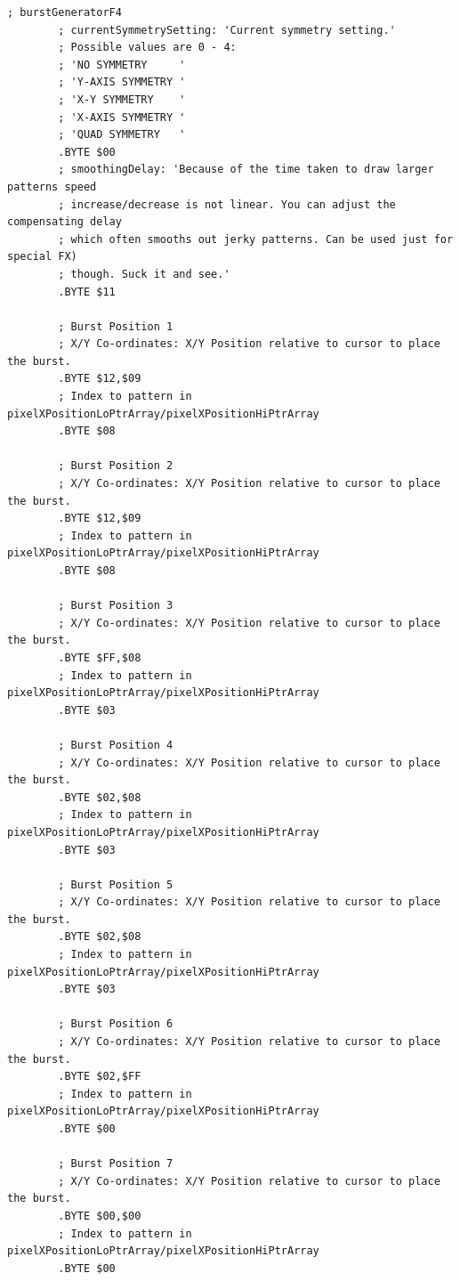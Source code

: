 \begin{lstlisting}[basicstyle=\tiny,caption=Source code for the F3 Burst.]
; burstGeneratorF4
        ; currentSymmetrySetting: 'Current symmetry setting.'
        ; Possible values are 0 - 4:
        ; 'NO SYMMETRY     '
        ; 'Y-AXIS SYMMETRY '
        ; 'X-Y SYMMETRY    '
        ; 'X-AXIS SYMMETRY '
        ; 'QUAD SYMMETRY   '
        .BYTE $00
        ; smoothingDelay: 'Because of the time taken to draw larger patterns speed
        ; increase/decrease is not linear. You can adjust the compensating delay
        ; which often smooths out jerky patterns. Can be used just for special FX)
        ; though. Suck it and see.'
        .BYTE $11

        ; Burst Position 1
        ; X/Y Co-ordinates: X/Y Position relative to cursor to place the burst.
        .BYTE $12,$09
        ; Index to pattern in pixelXPositionLoPtrArray/pixelXPositionHiPtrArray
        .BYTE $08

        ; Burst Position 2
        ; X/Y Co-ordinates: X/Y Position relative to cursor to place the burst.
        .BYTE $12,$09
        ; Index to pattern in pixelXPositionLoPtrArray/pixelXPositionHiPtrArray
        .BYTE $08

        ; Burst Position 3
        ; X/Y Co-ordinates: X/Y Position relative to cursor to place the burst.
        .BYTE $FF,$08
        ; Index to pattern in pixelXPositionLoPtrArray/pixelXPositionHiPtrArray
        .BYTE $03

        ; Burst Position 4
        ; X/Y Co-ordinates: X/Y Position relative to cursor to place the burst.
        .BYTE $02,$08
        ; Index to pattern in pixelXPositionLoPtrArray/pixelXPositionHiPtrArray
        .BYTE $03

        ; Burst Position 5
        ; X/Y Co-ordinates: X/Y Position relative to cursor to place the burst.
        .BYTE $02,$08
        ; Index to pattern in pixelXPositionLoPtrArray/pixelXPositionHiPtrArray
        .BYTE $03

        ; Burst Position 6
        ; X/Y Co-ordinates: X/Y Position relative to cursor to place the burst.
        .BYTE $02,$FF
        ; Index to pattern in pixelXPositionLoPtrArray/pixelXPositionHiPtrArray
        .BYTE $00

        ; Burst Position 7
        ; X/Y Co-ordinates: X/Y Position relative to cursor to place the burst.
        .BYTE $00,$00
        ; Index to pattern in pixelXPositionLoPtrArray/pixelXPositionHiPtrArray
        .BYTE $00


\end{lstlisting}
